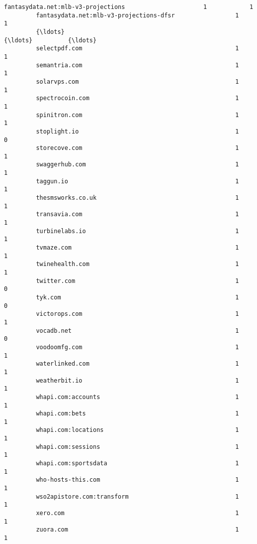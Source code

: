 \documentclass[11pt]{article}
\begin{document}
\begin{Verbatim}[commandchars=\\\{\}]
         fantasydata.net:mlb-v3-projections                      1            1   
         fantasydata.net:mlb-v3-projections-dfsr                 1            1   
         {\ldots}                                                   {\ldots}          {\ldots}   
         selectpdf.com                                           1            1   
         semantria.com                                           1            1   
         solarvps.com                                            1            1   
         spectrocoin.com                                         1            1   
         spinitron.com                                           1            1   
         stoplight.io                                            1            0   
         storecove.com                                           1            1   
         swaggerhub.com                                          1            1   
         taggun.io                                               1            1   
         thesmsworks.co.uk                                       1            1   
         transavia.com                                           1            1   
         turbinelabs.io                                          1            1   
         tvmaze.com                                              1            1   
         twinehealth.com                                         1            1   
         twitter.com                                             1            0   
         tyk.com                                                 1            0   
         victorops.com                                           1            1   
         vocadb.net                                              1            0   
         voodoomfg.com                                           1            1   
         waterlinked.com                                         1            1   
         weatherbit.io                                           1            1   
         whapi.com:accounts                                      1            1   
         whapi.com:bets                                          1            1   
         whapi.com:locations                                     1            1   
         whapi.com:sessions                                      1            1   
         whapi.com:sportsdata                                    1            1   
         who-hosts-this.com                                      1            1   
         wso2apistore.com:transform                              1            1   
         xero.com                                                1            1   
         zuora.com                                               1            1   
         

\end{Verbatim}
\end{document}
